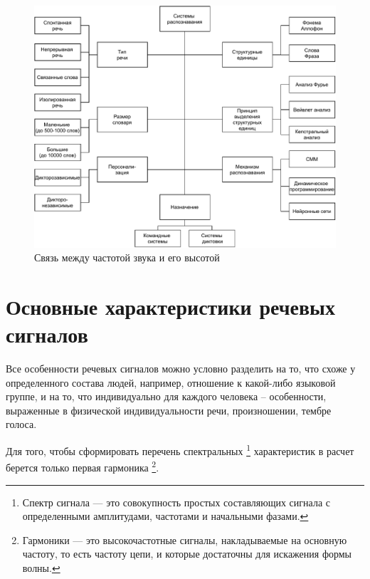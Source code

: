 \begin{figure}[h!]
	\includegraphics[pages=-, scale=0.9]{./inc/img/2.pdf}
	\caption{Связь между частотой звука и его высотой}  
	\label{fig:xray3}
\end{figure}
\newpage


\section{Основные характеристики речевых сигналов}
Все особенности речевых сигналов можно условно разделить на то, что схоже у определенного состава людей, например, отношение к какой-либо языковой группе, и на то, что индивидуально для каждого человека -- особенности, выраженные в физической индивидуальности речи, произношении, тембре голоса. \cite{chastot} \cite{chastot2}

Для того, чтобы сформировать перечень спектральных \footnote{Спектр сигнала — это совокупность простых составляющих сигнала с определенными амплитудами, частотами и начальными фазами.\cite{spektr}} характеристик в расчет берется только первая гармоника \footnote{Гармоники — это высокочастотные сигналы, накладываемые на основную частоту, то есть частоту цепи, и которые достаточны для искажения формы волны.\cite{spektr}}. 

